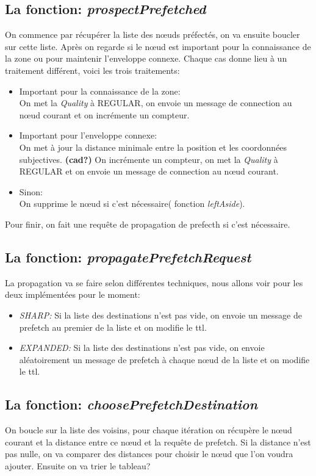\documentclass[11pt,a4paper]{article}
\begin{document}
\subsection{La fonction: \textit{prospectPrefetched}}
On commence par récupérer la liste des nœuds préfectés, on va ensuite boucler sur cette liste. Après on regarde si le nœud est important pour la connaissance de la zone ou pour maintenir l'enveloppe connexe. Chaque cas donne lieu à un traitement différent, voici les trois traitements:
\begin{itemize}
	\renewcommand{\labelitemi}{$\bullet$} 
	\item Important pour la connaissance de la zone:\\
		On met la \textit{Quality} à REGULAR, on envoie un message de connection au nœud courant et on incrémente un compteur.
	\item Important pour l'enveloppe connexe:\\
		On met à jour la distance minimale entre la position et les coordonnées subjectives. \textbf{(cad?)} On incrémente un compteur, on met la \textit{Quality} à REGULAR et on envoie un message de connection au nœud courant.
	\item Sinon:\\
		On supprime le nœud si c'est nécessaire( fonction \textit{leftAside}).
\end{itemize}
Pour finir, on fait une requête de propagation de prefecth si c'est nécessaire.

\subsection{La fonction: \textit{propagatePrefetchRequest}}
La propagation va se faire selon différentes techniques, nous allons voir pour les deux implémentées pour le moment:
\begin{itemize}
	\renewcommand{\labelitemi}{$\bullet$} 
	\item \textit{SHARP:} Si la liste des destinations n'est pas vide, on envoie un message de prefetch au premier de la liste et on modifie le ttl.
	\item \textit{EXPANDED:} Si la liste des destinations n'est pas vide, on envoie aléatoirement un message de prefetch à chaque nœud de la liste et on modifie le ttl.
\end{itemize}

\subsection{La fonction: \textit{choosePrefetchDestination}}
On boucle sur la liste des voisins, pour chaque itération on récupère le nœud courant et la distance entre ce nœud et la requête de prefetch. Si la distance n'est pas nulle, on va comparer des distances pour choisir le nœud que l'on voudra ajouter. Ensuite on va trier le tableau?
\end{document}
